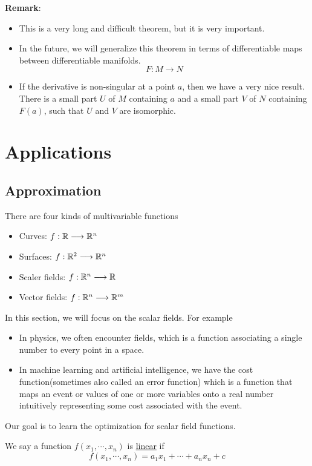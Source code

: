 \noindent \textbf{Remark}:
\begin{itemize}
    \item This is a very long and difficult theorem, but it is very important.
    \item In the future, we will generalize this theorem in terms of differentiable maps between differentiable manifolds.$$F:M\longrightarrow N$$ 
    \item If the derivative is non-singular at a point $a$, then we have a very nice result. There is a small part $U$ of $M$ containing $a$ and a small part $V$ of $N$ containing $F(a)$, such that $U$ and $V$ are isomorphic.
\end{itemize}

\section{Applications}

\subsection{Approximation}

There are four kinds of multivariable functions
\begin{itemize}
    \item Curves: $f:\mathbb{R}\longrightarrow \mathbb{R}^n$
    \item Surfaces: $f:\mathbb{R}^2\longrightarrow \mathbb{R}^n$
    \item Scaler fields: $f:\mathbb{R}^n \longrightarrow \mathbb{R}$
    \item Vector fields: $f:\mathbb{R}^n \longrightarrow \mathbb{R}^m$
\end{itemize}
In this section, we will focus on the scalar fields. For example
\begin{itemize}
    \item In physics, we often encounter fields, which is a function associating a single number to every point in a space.
    \item In machine learning and artificial intelligence, we have the cost function(sometimes also called an error function) which is a function that maps an event or values of one or more variables onto a real number intuitively representing some cost associated with the event.
\end{itemize}
Our goal is to learn the optimization for scalar field functions.\\
\begin{definition}
    We say a function $f(x_1,\cdots,x_n)$ is \underline{linear} if $$f(x_1,\cdots,x_n)=a_1x_1+\cdots+a_nx_n+c$$
\end{definition}

